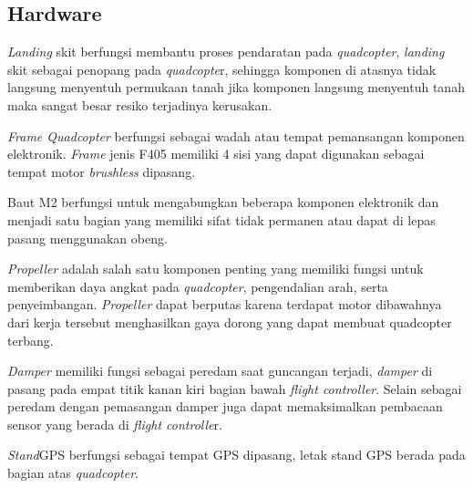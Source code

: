 \subsection{Hardware}
\begin{packed_item}
	\item [1.]\textit{Landing} skit
	berfungsi membantu proses pendaratan pada \textit{quadcopter}, \textit{landing} skit sebagai penopang pada \textit{quadcopte}r, sehingga komponen di atasnya tidak langsung menyentuh permukaan tanah jika komponen langsung menyentuh tanah maka sangat besar resiko terjadinya kerusakan.
	\item [2.] \textit{Frame Quadcopter}
	berfungsi sebagai wadah atau tempat pemansangan komponen elektronik. \textit{Frame} jenis F405 memiliki 4 sisi yang dapat digunakan sebagai tempat motor \textit{brushless} dipasang.
	\item [3.]Baut M2
	berfungsi untuk mengabungkan beberapa komponen elektronik dan menjadi satu bagian yang memiliki sifat tidak permanen atau dapat di lepas pasang  menggunakan obeng.
	\item [4.]\textit{Propeller}
	adalah salah satu komponen penting yang memiliki fungsi untuk memberikan daya angkat pada \textit{quadcopter}, pengendalian arah, serta penyeimbangan. \textit{Propeller} dapat berputas karena terdapat motor dibawahnya dari kerja tersebut menghasilkan gaya dorong yang dapat membuat quadcopter terbang.
	\item [5.]\textit{Damper}
	memiliki fungsi sebagai peredam saat guncangan terjadi, \textit{damper} di pasang pada empat titik kanan kiri bagian bawah \textit{flight controller}. Selain sebagai peredam dengan pemasangan damper juga dapat memaksimalkan pembacaan sensor yang berada di \textit{flight controlle}r.
	\item [6.]\textit{Stand}GPS
	berfungsi sebagai tempat GPS dipasang, letak stand GPS berada pada bagian atas \textit{quadcopter}.
\end{packed_item}

